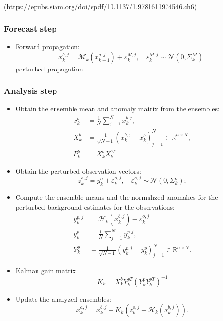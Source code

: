 \documentclass{article}
\begin{document}
(https://epubs.siam.org/doi/epdf/10.1137/1.9781611974546.ch6)

\subsubsection{Forecast step}
\begin{itemize}
	\item Forward propagation:
	      $$
		      x_k^{b,j}=\mathcal{M}_k(x_{k-1}^{a,j})+\varepsilon_k^{M,j},\quad \varepsilon_k^{M,j}\sim\mathcal{N}(0,\Sigma_k^M);
	      $$
	      perturbed propagation
\end{itemize}


\subsubsection{Analysis step}
\begin{itemize}
	\item Obtain the ensemble mean and anomaly matrix from the ensembles:
	      \begin{align*}
		      x_k^b & = \frac1N\sum_{j=1}^Nx_k^{b,j},                                           \\
		      X_k^b & = \frac1{\sqrt{N-1}}(x_k^{b,j} - x_k^b)_{j=1}^N\in\mathbb{R}^{n\times N}, \\
		      P_k^b & = X_k^bX_k^{bT}
	      \end{align*}
	\item Obtain the perturbed observation vectors:
	      $$
		      z_k^{o,j} = y_k^o + \varepsilon_k^{o,j},\quad\varepsilon_k^{o,j}\sim\mathcal{N}(0,\Sigma_k^o);
	      $$
	\item Compute the ensemble means and the normalized anomalies for the perturbed background estimates for the observations:
	      \begin{align*}
		      y_k^{p,j} & = \mathcal{H}_k(x_k^{b,j}) - \varepsilon_k^{o,j}                          \\
		      y_k^p     & = \frac1N\sum_{j=1}^Ny_k^{p,j},                                           \\
		      Y_k^p     & = \frac1{\sqrt{N-1}}(y_k^{p,j} - y_k^p)_{j=1}^N\in\mathbb{R}^{n\times N}.
	      \end{align*}
	\item Kalman gain matrix
	      $$
		      K_k=X_k^bY_k^{pT}(Y_k^pY_k^{pT})^{-1}
	      $$
	\item Update the analyzed ensembles:
	      $$
		      x_k^{a,j}=x_k^{b,j}+K_k(z_k^{o,j}-\mathcal{H}_k(x_k^{b,j})).
	      $$
\end{itemize}
\end{document}

